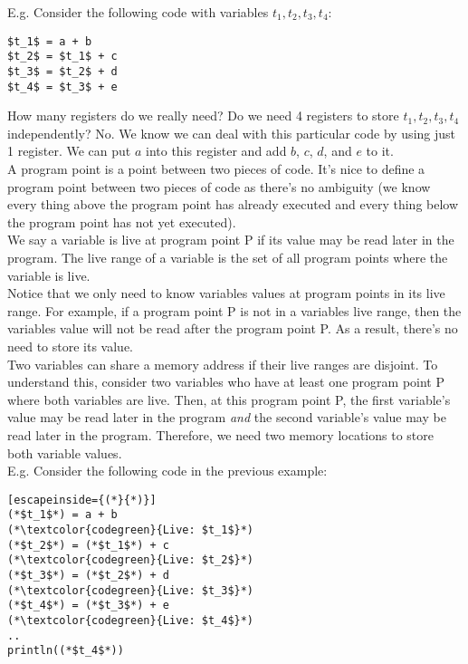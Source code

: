 \documentclass[12pt, letterpaper]{article}
\begin{document}
E.g. Consider the following code with variables \(t_1, t_2, t_3, t_4\):
\begin{lstlisting}[mathescape]
$t_1$ = a + b
$t_2$ = $t_1$ + c
$t_3$ = $t_2$ + d
$t_4$ = $t_3$ + e
\end{lstlisting}

How many registers do we really need? Do we need 4 registers to store \(t_1, t_2, t_3, t_4\) independently? No. We know we can deal with this particular code by using just 1 register. We can put \(a\) into this register and add \(b\), \(c\), \(d\), and \(e\) to it.\\

A program point is a point between two pieces of code. It's nice to define a program point between two pieces of code as there's no ambiguity (we know every thing above the program point has already executed and every thing below the program point has not yet executed).\\

We say a variable is live at program point P if its value may be read later in the program. The live range of a variable is the set of all program points where the variable is live.\\

Notice that we only need to know variables values at program points in its live range. For example, if a program point P is not in a variables live range, then the variables value will not be read after the program point P. As a result, there's no need to store its value.\\

Two variables can share a memory address if their live ranges are disjoint. To understand this, consider two variables who have at least one program point P where both variables are live. Then, at this program point P, the first variable's value may be read later in the program \emph{and} the second variable's value may be read later in the program. Therefore, we need two memory locations to store both variable values.\\

E.g. Consider the following code in the previous example:
\begin{lstlisting}[escapeinside={(*}{*)}]
(*$t_1$*) = a + b
(*\textcolor{codegreen}{Live: $t_1$}*)
(*$t_2$*) = (*$t_1$*) + c
(*\textcolor{codegreen}{Live: $t_2$}*)
(*$t_3$*) = (*$t_2$*) + d
(*\textcolor{codegreen}{Live: $t_3$}*)
(*$t_4$*) = (*$t_3$*) + e
(*\textcolor{codegreen}{Live: $t_4$}*)
..
println((*$t_4$*))
\end{lstlisting}
\end{document}

